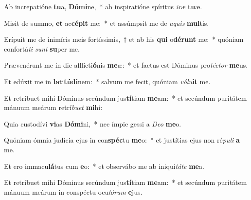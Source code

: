 \item Ab increpatióne \textbf{tu}a, \textbf{Dó}\textbf{mi}ne,~* ab inspiratióne spíritus \textit{i}\textit{ræ} \textbf{tu}æ.
\item Misit de summo, \textbf{et} ac\textbf{cé}\textbf{pit} me:~* et assúmpsit me de \textit{a}\textit{quis} \textbf{mul}tis.
\item Erípuit me de inimícis meis fortíssimis,~† et ab his \textbf{qui} o\textbf{dé}\textbf{runt} me:~* quóniam confortá\textit{ti} \textit{sunt} \textbf{su}per me.
\item Prævenérunt me in die afflicti\textbf{ó}nis \textbf{me}æ:~* et factus est Dóminus pro\textit{téc}\textit{tor} \textbf{me}us.
\item Et edúxit me in \textbf{la}ti\textbf{tú}\textbf{di}nem:~* salvum me fecit, quóniam \textit{vó}\textit{lu}\textbf{it} me.
\item Et retríbuet mihi Dóminus secúndum jus\textbf{tí}tiam \textbf{me}am:~* et secúndum puritátem mánuum meárum retrí\textit{bu}\textit{et} \textbf{mi}hi:
\item Quia custodívi \textbf{vi}as \textbf{Dó}\textbf{mi}ni,~* nec ímpie gessi a \textit{De}\textit{o} \textbf{me}o.
\item Quóniam ómnia judícia ejus in con\textbf{spéc}tu \textbf{me}o:~* et justítias ejus non ré\textit{pu}\textit{li} \textbf{a} me.
\item Et ero immacu\textbf{lá}tus cum \textbf{e}o:~* et observábo me ab iniqui\textit{tá}\textit{te} \textbf{me}a.
\item Et retríbuet mihi Dóminus secúndum jus\textbf{tí}tiam \textbf{me}am:~* et secúndum puritátem mánuum meárum in conspéctu ocu\textit{ló}\textit{rum} \textbf{e}jus.
